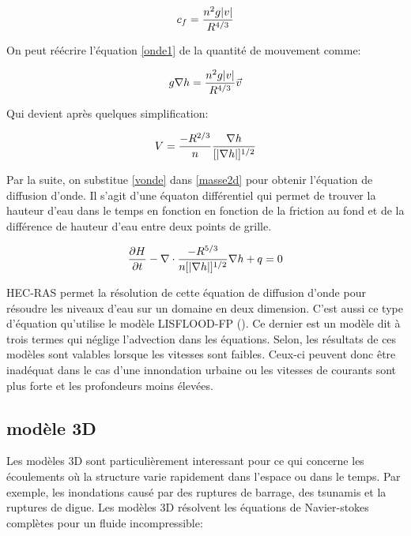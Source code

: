 \documentclass[12pt]{article}   %
\DeclarePairedDelimiter\abs{\lvert}{\rvert}%
\begin{document}
    \begin{align}
        c_f = \frac{n^2 g \abs{v}}{R^{4/3}}
    \end{align}
    
    On peut réécrire l'équation \ref{onde1} de la quantité de mouvement comme:
    
    \begin{align}
     g\nabla h = \frac{n^2 g \abs{v}}{R^{4/3}}\Vec{v} 
    \end{align}
    
    Qui devient après quelques simplification:
    
     \begin{align}
     V = \frac{-R^{2/3}}{n}\frac{\nabla h}{[\abs{\nabla h}]^{1/2}}
     \label{vonde}
    \end{align}
    
    Par la suite, on substitue \ref{vonde} dans \ref{masse2d} pour obtenir l'équation de diffusion d'onde. Il s'agit d'une équaton différentiel qui permet de trouver la hauteur d'eau dans le temps en fonction en fonction de la friction au fond et de la différence de hauteur d'eau entre deux points de grille. 
    
        \begin{align}
     \frac{\partial H}{\partial t} - \nabla \cdot \frac{-R^{5/3}}{n [\abs{\nabla h}]^{1/2}} \nabla h + q = 0 
    \end{align}
    
     HEC-RAS permet la résolution de cette équation de diffusion d'onde pour résoudre les niveaux d'eau sur un domaine en deux dimension. C'est aussi ce type d'équation qu'utilise le modèle LISFLOOD-FP (\cite{BATES201033}). Ce dernier est un modèle dit à trois termes qui néglige l'advection dans les équations. Selon, \cite{Hunter2007} les résultats de ces modèles sont valables lorsque les vitesses sont faibles. Ceux-ci peuvent donc être inadéquat dans le cas d'une innondation urbaine ou les vitesses de courants sont plus forte et les profondeurs moins élevées. 
    
    \subsection{modèle 3D}
    
    Les modèles 3D sont particulièrement interessant pour ce qui concerne les écoulements où la structure varie rapidement dans l'espace ou dans le temps. Par exemple, les inondations causé par des ruptures de barrage, des tsunamis et la ruptures de digue.\cite{Teng2017} Les modèles 3D résolvent les équations de Navier-stokes complètes pour un fluide incompressible:
    
\end{document}
